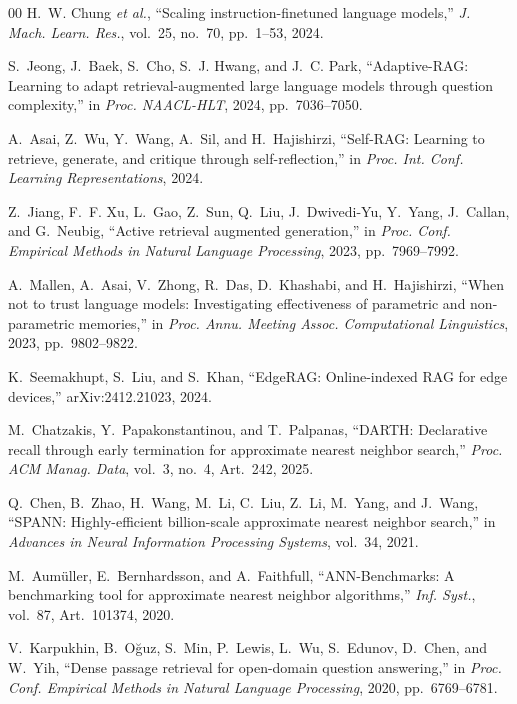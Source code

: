 \documentclass[conference]{IEEEtran}
\begin{document}
\begin{thebibliography}{00}
H.~W. Chung \emph{et al.}, ``Scaling instruction-finetuned language models,''
\emph{J. Mach. Learn. Res.}, vol.~25, no.~70, pp.~1--53, 2024.

S.~Jeong, J.~Baek, S.~Cho, S.~J. Hwang, and J.~C. Park, ``Adaptive-RAG:
Learning to adapt retrieval-augmented large language models through question
complexity,'' in \emph{Proc. NAACL-HLT}, 2024, pp.~7036--7050.

A.~Asai, Z.~Wu, Y.~Wang, A.~Sil, and H.~Hajishirzi, ``Self-RAG: Learning to
retrieve, generate, and critique through self-reflection,'' in \emph{Proc.
Int. Conf. Learning Representations}, 2024.

Z.~Jiang, F.~F. Xu, L.~Gao, Z.~Sun, Q.~Liu, J.~Dwivedi-Yu, Y.~Yang, J.~Callan,
and G.~Neubig, ``Active retrieval augmented generation,'' in \emph{Proc. Conf.
Empirical Methods in Natural Language Processing}, 2023, pp.~7969--7992.

A.~Mallen, A.~Asai, V.~Zhong, R.~Das, D.~Khashabi, and H.~Hajishirzi, ``When
not to trust language models: Investigating effectiveness of parametric and
non-parametric memories,'' in \emph{Proc. Annu. Meeting Assoc. Computational
Linguistics}, 2023, pp.~9802--9822.

K.~Seemakhupt, S.~Liu, and S.~Khan, ``EdgeRAG: Online-indexed RAG for edge
devices,'' arXiv:2412.21023, 2024.

M.~Chatzakis, Y.~Papakonstantinou, and T.~Palpanas, ``DARTH: Declarative recall
through early termination for approximate nearest neighbor search,''
\emph{Proc. ACM Manag. Data}, vol.~3, no.~4, Art.~242, 2025.

Q.~Chen, B.~Zhao, H.~Wang, M.~Li, C.~Liu, Z.~Li, M.~Yang, and J.~Wang, ``SPANN:
Highly-efficient billion-scale approximate nearest neighbor search,'' in
\emph{Advances in Neural Information Processing Systems}, vol.~34, 2021.

M.~Aum\"uller, E.~Bernhardsson, and A.~Faithfull, ``ANN-Benchmarks: A
benchmarking tool for approximate nearest neighbor algorithms,'' \emph{Inf.
Syst.}, vol.~87, Art.~101374, 2020.

V.~Karpukhin, B.~O\u{g}uz, S.~Min, P.~Lewis, L.~Wu, S.~Edunov, D.~Chen, and
W.~Yih, ``Dense passage retrieval for open-domain question answering,'' in
\emph{Proc. Conf. Empirical Methods in Natural Language Processing}, 2020,
pp.~6769--6781.


\end{thebibliography}
\end{document}
